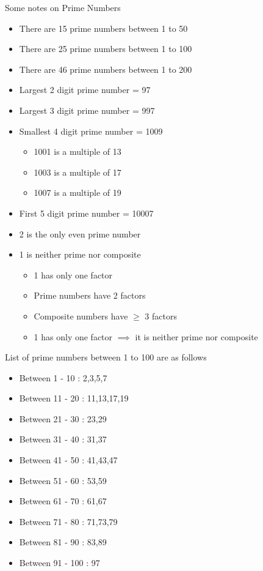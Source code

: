 Some notes on Prime Numbers
\begin{multicols}{2}
    \begin{itemize}
        \item There are 15 prime numbers between 1 to 50
        \item There are 25 prime numbers between 1 to 100
        \item There are 46 prime numbers between 1 to 200
        \item Largest 2 digit prime number = 97
        \item Largest 3 digit prime number = 997
        \item Smallest 4 digit prime number = 1009
        \begin{itemize}
            \item 1001 is a multiple of 13
            \item 1003 is a multiple of 17
            \item 1007 is a multiple of 19
        \end{itemize}            
        \item First 5 digit prime number = 10007
    \end{itemize}

    \columnbreak
    \begin{itemize}
        \item 2 is the only even prime number
        \item 1 is neither prime nor composite    
        \begin{itemize}
            \item 1 has only one factor
            \item Prime numbers have 2 factors
            \item Composite numbers have $\geq$ 3 factors
            \item 1 has only one factor $\implies$ it is neither prime nor composite
        \end{itemize}
    \end{itemize}


\end{multicols}

\begin{NOTE}
    List of prime numbers between 1 to 100 are as follows
    \begin{itemize}
        \item Between 1 - 10 : 2,3,5,7
        \item Between 11 - 20 : 11,13,17,19
        \item Between 21 - 30 : 23,29
        \item Between 31 - 40 : 31,37
        \item Between 41 - 50 : 41,43,47
        \item Between 51 - 60 : 53,59
        \item Between 61 - 70 : 61,67
        \item Between 71 - 80 : 71,73,79
        \item Between 81 - 90 : 83,89
        \item Between 91 - 100 : 97
    \end{itemize}
\end{NOTE}


